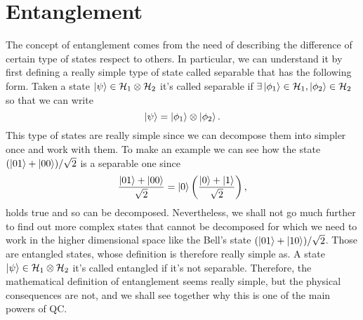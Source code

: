 \section{Entanglement}

The concept of entanglement comes from the need of describing the difference of certain type of states respect to others. In particular, we can understand it by first defining a really simple type of state called separable that has the following form.
{
    Taken a state $\ket{\psi}\in\mathcal{H}_1\otimes\mathcal{H}_2$ it's called separable if $\exists \ket{\phi_1}\in \mathcal{H}_1, \ket{\phi_2} \in \mathcal{H}_2$ so that we can write
    \begin{equation}
        \ket{\psi} = \ket{\phi_1}\otimes\ket{\phi_2}.
    \end{equation}
}
\noindent
This type of states are really simple since we can decompose them into simpler once and work with them. To make an example we can see how the state $(\ket{01} + \ket{00})/\sqrt{2}$ is a separable one since
\begin{equation}
    \frac{\ket{01} + \ket{00}}{\sqrt{2}} = \ket{0}\left( \frac{\ket{0} + \ket{1}}{\sqrt{2}} \right),
\end{equation}
holds true and so can be decomposed. Nevertheless, we shall not go much further to find out more complex states that cannot be decomposed for which we need to work in the higher dimensional space like the Bell's state $(\ket{01} + \ket{10})/\sqrt{2}$. Those are entangled states, whose definition is therefore really simple as.
{
    A state $\ket{\psi}\in\mathcal{H}_1\otimes\mathcal{H}_2$ it's called entangled if it's not separable.
}
\noindent
Therefore, the mathematical definition of entanglement seems really simple, but the physical consequences are not, and we shall see together why this is one of the main powers of QC.